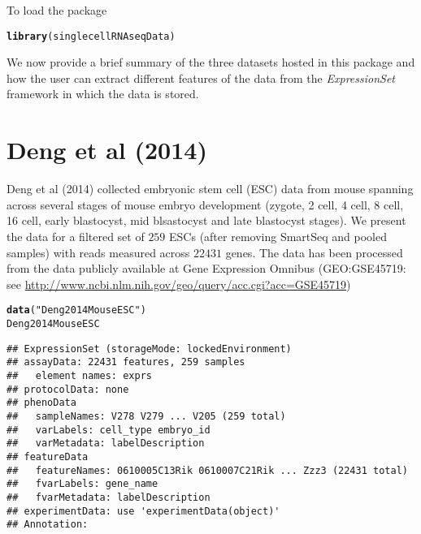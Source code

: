 \documentclass[12pt]{article}\usepackage[]{graphicx}\usepackage[usenames,dvipsnames]{color}
\makeatletter
\newcommand{\hlstr}[1]{\textcolor[rgb]{0.192,0.494,0.8}{#1}}%
\newcommand{\hlstd}[1]{\textcolor[rgb]{0.345,0.345,0.345}{#1}}%
\newcommand{\hlkwd}[1]{\textcolor[rgb]{0.737,0.353,0.396}{\textbf{#1}}}%
\newenvironment{kframe}{%
 \def\at@end@of@kframe{}%
 \ifinner\ifhmode%
  \def\at@end@of@kframe{\end{minipage}}%
  \begin{minipage}{\columnwidth}%
 \fi\fi%
 \def\FrameCommand##1{\hskip\@totalleftmargin \hskip-\fboxsep
 \colorbox{shadecolor}{##1}\hskip-\fboxsep
     \hskip-\linewidth \hskip-\@totalleftmargin \hskip\columnwidth}%
 \MakeFramed {\advance\hsize-\width
   \@totalleftmargin\z@ \linewidth\hsize
   \@setminipage}}%
 {\par\unskip\endMakeFramed%
 \at@end@of@kframe}
\newenvironment{knitrout}{}{} %
\makeatother
\begin{document}
To load the package

\begin{knitrout}
\color{fgcolor}\begin{kframe}
\begin{alltt}
\hlkwd{library}\hlstd{(singlecellRNAseqData)}
\end{alltt}
\end{kframe}
\end{knitrout}

We now provide a brief summary of the three datasets hosted in this package and how the user can extract different features of the data from the \textit{ExpressionSet} framework in which the data is stored.

\section{Deng et al (2014)}

Deng et al (2014) \cite{Deng2014} collected embryonic stem cell (ESC) data from mouse spanning across several stages of mouse embryo development (zygote, 2 cell, 4 cell, 8 cell, 16 cell,
early blastocyst, mid blsastocyst and late blastocyst stages). We present the data for a filtered set of $259$ ESCs (after removing SmartSeq and pooled samples) with reads measured across $22431$ genes. The data has been processed from the data publicly available at Gene Expression Omnibus (GEO:GSE45719: see \url{http://www.ncbi.nlm.nih.gov/geo/query/acc.cgi?acc=GSE45719})

\begin{knitrout}
\color{fgcolor}\begin{kframe}
\begin{alltt}
\hlkwd{data}\hlstd{(}\hlstr{"Deng2014MouseESC"}\hlstd{)}
\hlstd{Deng2014MouseESC}
\end{alltt}
\begin{verbatim}
## ExpressionSet (storageMode: lockedEnvironment)
## assayData: 22431 features, 259 samples 
##   element names: exprs 
## protocolData: none
## phenoData
##   sampleNames: V278 V279 ... V205 (259 total)
##   varLabels: cell_type embryo_id
##   varMetadata: labelDescription
## featureData
##   featureNames: 0610005C13Rik 0610007C21Rik ... Zzz3 (22431 total)
##   fvarLabels: gene_name
##   fvarMetadata: labelDescription
## experimentData: use 'experimentData(object)'
## Annotation:
\end{verbatim}
\end{kframe}
\end{knitrout}
\end{document}
